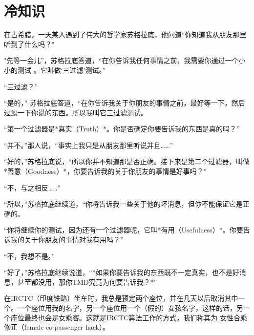 \documentclass[12pt,oneside]{book}
\begin{document}
\chapter{冷知识}
\begin{proposition}
	在古希腊，一天某人遇到了伟大的哲学家苏格拉底，他问道“你知道我从朋友那里听到了什么吗？"
	
	"先等一会儿”，苏格拉底答道，“在你告诉我任何事情之前，我需要你通过一个小小的测试 。它叫做‘三过滤’测试。”
	
	“三过滤？”
	
	“是的，” 苏格拉底答道，“在你告诉我关于你朋友的事情之前，最好等一下，然后过滤一下你说的东西。所以我叫它三过滤测试。
	
	“第一个过滤器是*真实（Truth）*。你是否确定你要告诉我的东西是真的吗？”
	
	“并不。”那人说，“事实上我只是从朋友那里听说并且……”
	
	“好的，”苏格拉底说，“所以你并不知道那是否正确。接下来是第二个过滤器，叫做*善意（Goodness）*，你要告诉我的关于你朋友的事情是好事吗？”
	
	“不，与之相反……”
	
	“所以，”苏格拉底继续道，“你将告诉我一些关于他的坏消息，但你不能保证它是正确的。
	
	“你将继续你的测试，因为还有一个过滤器呢，它叫*有用（Usefulness）*。你要告诉我的关于你朋友的事情对我有用吗？”
	
	“不，我想不是。”
	
	“好了，”苏格拉底继续说道，“*如果你要告诉我的东西既不一定真实，也不是好消息，甚至都没用，那你TMD究竟为何要告诉我？*”
	
\end{proposition}

\begin{proposition}[女性合乘修正]
在IRCTC（印度铁路）坐车时，我总是预定两个座位，并在几天以后取消其中一个。一个座位用我的名字，另一个座位用一个（假的）女孩名字，这样的话，另一个座位最终也会是女乘客。这就是IRCTC算法工作的方式，我们称其为 女性合乘修正（female co-passenger hack）。
\end{proposition}

	
\end{document}
